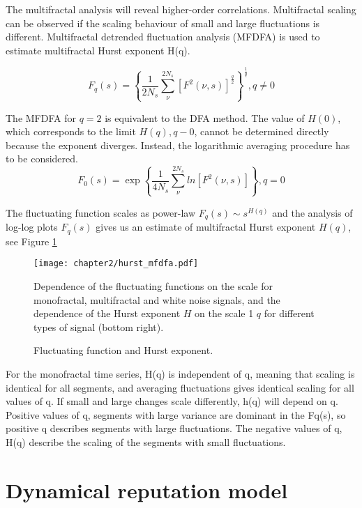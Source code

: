 The multifractal analysis will reveal higher-order correlations. Multifractal scaling can be observed if the scaling behaviour of small and large fluctuations is different. Multifractal detrended fluctuation analysis (MFDFA) is used \cite{kantelhardt2002, ihlen2012} to estimate multifractal Hurst exponent H(q). 

\begin{equation}
F_q(s) = \left\{\frac{1}{2N_s}\sum_{\nu}^{2N_s}\left[F^2(\nu, s)\right]^{\frac{q}{2}}\right\}^{\frac{1}{q}},  q \neq 0 \nonumber
\end{equation}

The MFDFA for $q=2$ is equivalent to the DFA method. The value of $H(0)$, which corresponds to the limit $H(q), q-0$, cannot be determined directly because the exponent diverges. Instead, the logarithmic averaging procedure has to be considered. 
\begin{equation}
F_0(s) = \exp \left\{\frac{1}{4N_s}\sum_{\nu}^{2N_s}ln \left[F^2(\nu, s)\right]\right\}, q=0
\end{equation}

The fluctuating function scales as power-law $F_q(s) \sim s^{H(q)}$ and the analysis of log-log plots $F_q(s)$ gives us an estimate of multifractal Hurst exponent $H(q)$, see Figure \ref{fig:hurst_mfdfa}

\begin{figure}[h]
	\centering
	\texttt{[image: chapter2/hurst\_mfdfa.pdf]}
	\caption{Fluctuating function and Hurst exponent.}{Dependence of the fluctuating functions on the scale for monofractal, multifractal and white noise signals, and the dependence of the Hurst exponent $H$ on the scale 1 $q$ for different types of signal (bottom right).  }
	\label{fig:hurst_mfdfa}
\end{figure}

For the monofractal time series, H(q) is independent of q, meaning that scaling is identical for all segments, and averaging fluctuations gives identical scaling for all values of q. If small and large changes scale differently, h(q) will depend on q. Positive values of q, segments with large variance are dominant in the Fq(s), so positive q describes segments with large fluctuations. The negative values of q, H(q) describe the scaling of the segments with small fluctuations. 

\section{Dynamical reputation model} \label{sec:met_dibrm}


